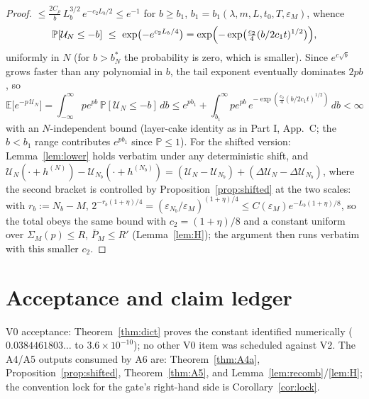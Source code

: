\documentclass[11pt,a4paper]{article}
\theoremstyle{plain}
\theoremstyle{definition}
\newcommand{\E}{\mathbb{E}}
\newcommand{\PP}{\mathbb{P}}
\newcommand{\eps}{\varepsilon}
\newcommand{\U}{\mathcal U}
\begin{document}
\begin{proof}
$\le\frac{2C_\rho}b\,L_b^{3/2}\,e^{-c_2L_b/2}\le e^{-1}$ for
$b\ge b_1$, $b_1=b_1(\lambda,m,L,t_0,T,\eps_M)$, whence
\[
 \PP[\U_N\le-b]\ \le\ \exp\bigl(-e^{c_2L_b/4}\bigr)
 =\exp\Bigl(-\exp\bigl(\tfrac{c_2}4(b/2c_1t)^{1/2}\bigr)\Bigr),
\]
uniformly in $N$ (for $b>b_N^*$ the probability is zero, which is smaller).
Since $e^{c\sqrt b}$ grows faster than any polynomial in $b$, the tail
exponent eventually dominates $2pb$, so
\[
 \E\bigl[e^{-p\,\U_N}\bigr]
 =\int_{-\infty}^\infty pe^{pb}\,\PP[\U_N\le-b]\,db
 \le e^{pb_1}+\int_{b_1}^\infty pe^{pb}\,
 e^{-\exp(\frac{c_2}4(b/2c_1t)^{1/2})}\,db<\infty
\]
with an $N$-independent bound (layer-cake identity as in Part I, App.\ C;
the $b<b_1$ range contributes $e^{pb_1}$ since $\PP\le1$). For the shifted
version: Lemma~\ref{lem:lower} holds verbatim under any deterministic
shift, and $\U_N(\cdot+h^{(N)})-\U_{N_b}(\cdot+h^{(N_b)})
=(\U_N-\U_{N_b})+(\Delta\U_N-\Delta\U_{N_b})$, where the second bracket is
controlled by Proposition~\ref{prop:shifted} at the two scales: with
$r_b:=N_b-M$, $2^{-r_b(1+\eta)/4}=(\eps_{N_b}/\eps_M)^{(1+\eta)/4}
\le C(\eps_M)e^{-L_b(1+\eta)/8}$, so the total obeys the same bound with
$c_2=(1+\eta)/8$ and a constant uniform over $\Sigma_M(p)\le R$,
$\bar P_M\le R'$ (Lemma~\ref{lem:H}); the argument then runs verbatim with
this smaller $c_2$.
\end{proof}

\section{Acceptance and claim ledger}\label{sec:ledger}

V0 acceptance: Theorem~\ref{thm:dict} proves the constant identified
numerically ($0.0384461803\ldots$ to $3.6\times10^{-10}$); no other V0 item
was scheduled against V2. The A4/A5 outputs consumed by A6 are:
Theorem~\ref{thm:A4a}, Proposition~\ref{prop:shifted},
Theorem~\ref{thm:A5}, and Lemma~\ref{lem:recomb}/\ref{lem:H}; the
convention lock for the gate's right-hand side is
Corollary~\ref{cor:lock}.
\end{document}
